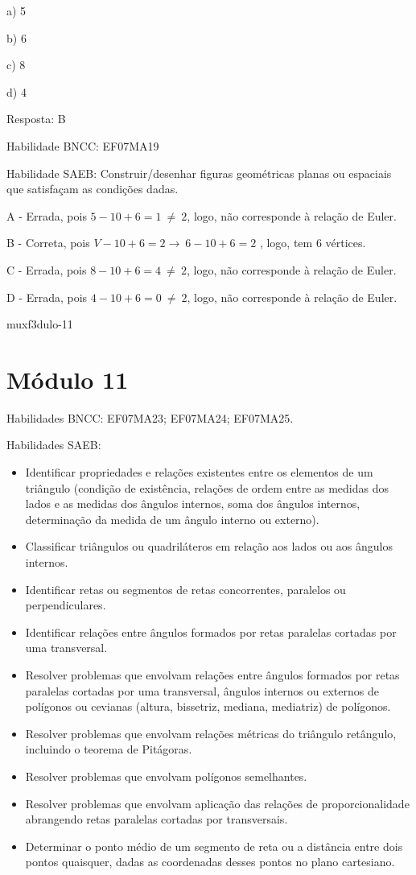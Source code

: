{a) 5

b) 6

c) 8

d) 4

Resposta: B

Habilidade BNCC: EF07MA19

Habilidade SAEB: Construir/desenhar figuras geométricas planas ou
espaciais que satisfaçam as condições dadas.

A - Errada, pois \(5 - 10 + 6 = 1\  \neq \ 2\), logo, não corresponde à
relação de Euler.

B - Correta, pois \(V - 10 + 6 = 2 \rightarrow \ 6 - 10 + 6 = 2\) ,
logo, tem 6 vértices.

C - Errada, pois \(8 - 10 + 6 = 4\  \neq \ 2\), logo, não corresponde à
relação de Euler.

D - Errada, pois \(4 - 10 + 6 = 0\  \neq \ 2\), logo, não corresponde à
relação de Euler.

muxf3dulo-11}{%
\section{Módulo 11}

Habilidades BNCC: EF07MA23; EF07MA24; EF07MA25.

Habilidades SAEB:

\begin{itemize}
\item
  Identificar propriedades e relações existentes entre os elementos de
  um triângulo (condição de existência, relações de ordem entre as
  medidas dos lados e as medidas dos ângulos internos, soma dos ângulos
  internos, determinação da medida de um ângulo interno ou externo).
\item
  Classificar triângulos ou quadriláteros em relação aos lados ou aos
  ângulos internos.
\item
  Identificar retas ou segmentos de retas concorrentes, paralelos ou
  perpendiculares.
\item
  Identificar relações entre ângulos formados por retas paralelas
  cortadas por uma transversal.
\item
  Resolver problemas que envolvam relações entre ângulos formados por
  retas paralelas cortadas por uma transversal, ângulos internos ou
  externos de polígonos ou cevianas (altura, bissetriz, mediana,
  mediatriz) de polígonos.
\item
  Resolver problemas que envolvam relações métricas do triângulo
  retângulo, incluindo o teorema de Pitágoras.
\item
  Resolver problemas que envolvam polígonos semelhantes.
\item
  Resolver problemas que envolvam aplicação das relações de
  proporcionalidade abrangendo retas paralelas cortadas por
  transversais.
\item
  Determinar o ponto médio de um segmento de reta ou a distância entre
  dois pontos quaisquer, dadas as coordenadas desses pontos no plano
  cartesiano.
\end{itemize}

}
